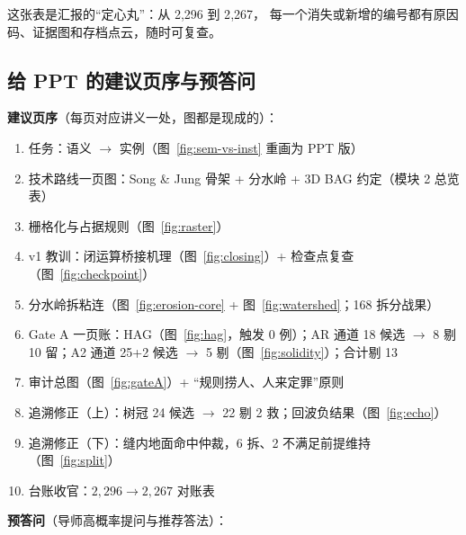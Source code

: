 这张表是汇报的``定心丸''：从 2{,}296 到 2{,}267，
每一个消失或新增的编号都有原因码、证据图和存档点云，随时可复查。

\subsection{给 PPT 的建议页序与预答问}

\textbf{建议页序}（每页对应讲义一处，图都是现成的）：
\begin{enumerate}
\item 任务：语义 $\to$ 实例（图~\ref{fig:sem-vs-inst} 重画为 PPT 版）
\item 技术路线一页图：Song \& Jung 骨架 + 分水岭 + 3D BAG 约定（模块 2 总览表）
\item 栅格化与占据规则（图~\ref{fig:raster}）
\item v1 教训：闭运算桥接机理（图~\ref{fig:closing}）+ 检查点复查（图~\ref{fig:checkpoint}）
\item 分水岭拆粘连（图~\ref{fig:erosion-core} + 图~\ref{fig:watershed}；168 拆分战果）
\item Gate A 一页账：HAG（图~\ref{fig:hag}，触发 0 例）；AR 通道 18 候选 $\to$
      8 剔 10 留；A2 通道 25+2 候选 $\to$ 5 剔（图~\ref{fig:solidity}）；合计剔 13
\item 审计总图（图~\ref{fig:gateA}）+ ``规则捞人、人来定罪''原则
\item 追溯修正（上）：树冠 24 候选 $\to$ 22 剔 2 救；回波负结果（图~\ref{fig:echo}）
\item 追溯修正（下）：缝内地面命中仲裁，6 拆、2 不满足前提维持（图~\ref{fig:split}）
\item 台账收官：$2{,}296 \to 2{,}267$ 对账表
\end{enumerate}

\textbf{预答问}（导师高概率提问与推荐答法）：


